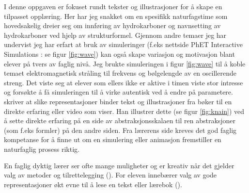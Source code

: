 \documentclass[main.tex]{subfiles}
\begin{document}
\newpage
\hspace{-6mm}I denne oppgaven er fokuset rundt tekster og illustrasjoner for å skape en tilpasset opplæring. Her har jeg snakket om en spesifikk naturfagstime som hovedsakelig dreier seg om innføring av hydrokarboner og navnsetting av hydrokarboner ved hjelp av strukturformel. Gjennom andre temaer jeg har undervist jeg har erfart at bruk av simuleringer (f.eks nettside PhET Interactive Simulations : se figur \ref{fig:wave}) kan også skape variasjon og motivasjon blant elever på tvers av faglig nivå. Jeg brukte simuleringen i figur \ref{fig:wave} til å koble temaet elektromagnetisk stråling til frekvens og bølgelengde av en oscillerende streng. Det viste seg at elever som ellers ikke er aktive i timen viste stor intresse og forsøkte å få simuleringen til å virke autentisk ved å endre på parametere.\
\newline\newline
{} skriver at slike representasjoner binder tekst og illustrasjoner fra bøker til en direkte erfaring eller video som viser. Han illustrer dette (se figur \ref{fig:knain}) ved å sette direkte erfaring på en side av abstraksjonsskalaen til ren abstraksjoner (som f.eks formler) på den andre siden. Fra lærerens side kreves det god faglig kompetanse for å finne ut om en simulering eller animasjon fremstiller en naturfaglig prosess riktig. 

\newpage
\hspace{-6mm}En faglig dyktig lærer ser ofte mange muligheter og er kreativ når det gjelder valg av metoder og tilrettelegging (). For eleven innebærer valg av gode representasjoner økt evne til å lese en tekst eller lærebok ().
\end{document}
